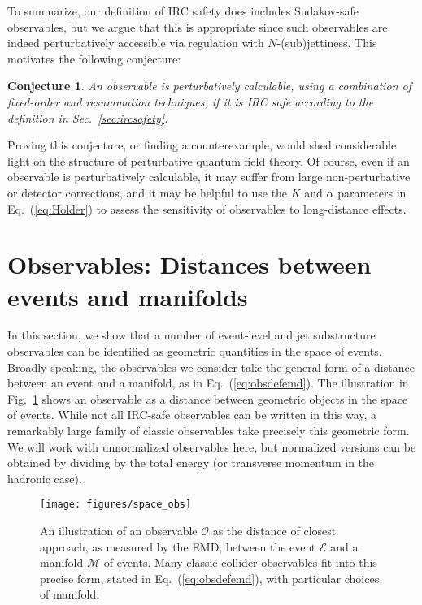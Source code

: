 \documentclass[letterpaper,11pt]{article}
\DeclareRobustCommand{\Sec}[1]{Sec.~\ref{#1}}
\DeclareRobustCommand{\Fig}[1]{Fig.~\ref{#1}}
\DeclareRobustCommand{\Eq}[1]{Eq.~(\ref{#1})}
\newtheorem{conjecture}{Conjecture}
\begin{document}
To summarize, our definition of IRC safety does includes Sudakov-safe observables, but we argue that this is appropriate since such observables are indeed perturbatively accessible via regulation with $N$-(sub)jettiness.
%
This motivates the following conjecture:
%
\begin{framed}
\begin{conjecture}\label{conj:safe_is_calculable}
%
An observable is perturbatively calculable, using a combination of fixed-order and resummation techniques, if it is IRC safe according to the definition in \Sec{sec:ircsafety}.
%
\end{conjecture}
\end{framed}
%
\noindent Proving this conjecture, or finding a counterexample, would shed considerable light on the structure of perturbative quantum field theory.
%
Of course, even if an observable is perturbatively calculable, it may suffer from large non-perturbative or detector corrections, and it may be helpful to use the $K$ and $\alpha$ parameters in \Eq{eq:Holder} to assess the sensitivity of observables to long-distance effects.




\section{Observables: Distances between events and manifolds}
\label{sec:observables}


In this section, we show that a number of event-level and jet substructure observables can be identified as geometric quantities in the space of events.
%
Broadly speaking, the observables we consider take the general form of a distance between an event and a manifold, as in \Eq{eq:obsdefemd}.
%
The illustration in \Fig{fig:space_obs} shows an observable as a distance between geometric objects in the space of events.
%
While not all IRC-safe observables can be written in this way, a remarkably large family of classic observables take precisely this geometric form.
%
We will work with unnormalized observables here, but normalized versions can be obtained by dividing by the total energy (or transverse momentum in the hadronic case).


\begin{figure}[t]
\centering
\texttt{[image: figures/space\_obs]}
\caption{\label{fig:space_obs} An illustration of an observable $\mathcal O$ as the distance of closest approach, as measured by the EMD, between the event $\mathcal E$ and a manifold $\mathcal M$ of events.
%
Many classic collider observables fit into this precise form, stated in \Eq{eq:obsdefemd}, with particular choices of manifold.
}
\end{figure}
\end{document}
